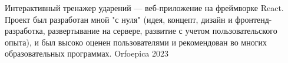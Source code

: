 

\begin{cventries}
  \cventry
    {Интерактивный тренажер ударений — веб-приложение на фреймворке React. Проект был разработан мной "с нуля" (идея, концепт, дизайн и фронтенд-разработка, развертывание на сервере, развитие с учетом пользовательского опыта), и был высоко оценен пользователями и  рекомендован во многих образовательных программах.} %
    {Orfoepica} %
    {2023} %
    {} %
    {}
\end{cventries}
